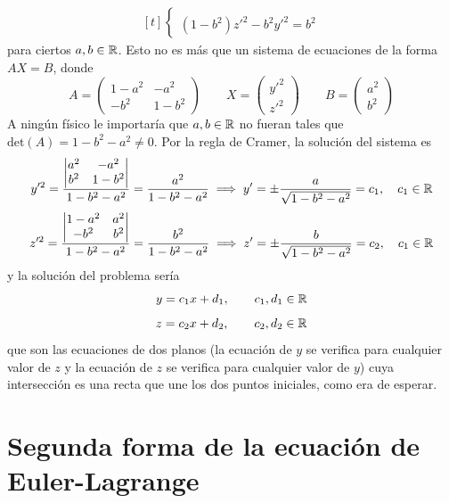\documentclass[12pt]{report}
\begin{document}
\begin{example}
\[\begin{aligned}[t]
\begin{cases}
\\
(1-b^2)z'^2 -b^2y'^2 = b^2
\end{cases}
\end{aligned}
\]
para ciertos $a,b \in \mathbb R$. Esto no es más que un sistema de ecuaciones de la forma $AX = B$, donde
\[A = \begin{pmatrix}
1-a^2 & -a^2 \\
-b^2 & 1-b^2
\end{pmatrix} \qquad X = 
\begin{pmatrix}
y'^2 \\
z'^2
\end{pmatrix} \qquad B = 
\begin{pmatrix}
a^2 \\
b^2
\end{pmatrix}
\]
A ningún físico le importaría que $a,b \in \mathbb R$ no fueran tales que $\mathrm{det}(A) = 1-b^2-a^2 \neq 0$. Por la regla de Cramer, la solución del sistema es
\[y'^2 = \frac{
\begin{vmatrix}
a^2 & -a^2 \\
b^2 & 1-b^2
\end{vmatrix}
}{1-b^2-a^2}
= \frac{a^2}{1-b^2-a^2} \implies y' = \pm \frac{a}{\sqrt{1-b^2-a^2}} = c_1, \quad c_1 \in \mathbb R\]
\[z'^2 = \frac{
\begin{vmatrix}
1-a^2 & a^2 \\
-b^2 & b^2
\end{vmatrix}
}{1-b^2-a^2}
= \frac{b^2}{1-b^2-a^2} \implies z' = \pm \frac{b}{\sqrt{1-b^2-a^2}} = c_2, \quad c_1 \in \mathbb R\]
y la solución del problema sería
\[y = c_1x+d_1, \qquad c_1,d_1 \in \mathbb R\]
\[z = c_2x+d_2, \qquad c_2,d_2 \in \mathbb R\]
que son las ecuaciones de dos planos (la ecuación de $y$ se verifica para cualquier valor de $z$ y la ecuación de $z$ se verifica para cualquier valor de $y$) cuya intersección es una recta que une los dos puntos iniciales, como era de esperar.

\end{example}

\section{Segunda forma de la ecuación de Euler-Lagrange}
\end{document}
